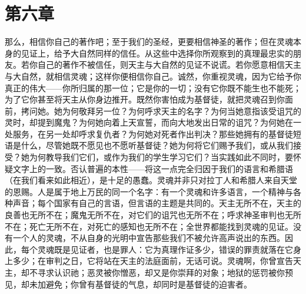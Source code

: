 
\section{第六章}

那么，相信你自己的著作吧；至于我们的圣经，更要相信神圣的著作；但在灵魂本身的见证上，给予大自然同样的信任。从这些中选择你所观察到的真理最忠实的朋友。若你自己的著作不被信任，则天主与大自然的见证不说谎。若你愿意相信天主与大自然，就相信灵魂；这样你便相信你自己。诚然，你重视灵魂，因为它给予你真正的伟大——你所归属的那一位；它是你的一切；没有它你既不能生也不能死；为了它你甚至将天主从你身边推开。既然你害怕成为基督徒，就把灵魂召到你面前，拷问她。她为何敬拜另一位？为何呼求天主的名字？为何当她意指该受诅咒的灵时，却提到魔鬼？为何她向着上天宣誓，而向大地发出日常的诅咒？为何她在一处服务，在另一处却呼求复仇者？为何她对死者作出判决？那些她拥有的基督徒短语是什么，尽管她既不愿见也不愿听基督徒？她为何将它们赐予我们，或从我们接受？她为何教导我们它们，或作为我们的学生学习它们？当实践如此不同时，要怀疑文字上的一致。否认普遍的本性——将这一点完全归因于我们的语言和希腊语（在我们看来如此相近），是十足的愚蠢。灵魂并非只对拉丁人和希腊人来自天堂的恩赐。人是属于地上万民的同一个名字：有一个灵魂和许多语言，一个精神与各种声音；每个国家有自己的言语，但言语的主题是共同的。天主无所不在，天主的良善也无所不在；魔鬼无所不在，对它们的诅咒也无所不在；呼求神圣审判也无所不在；死亡无所不在，对死亡的感知也无所不在；全世界都能找到灵魂的见证。没有一个人的灵魂，不从自身的光明中宣告那些我们不被允许高声说出的东西。因此，每个灵魂既是见证者，也是罪人：它为真理作证多少，错误的罪责就落在它身上多少；在审判之日，它将站在天主的法庭面前，无话可说。灵魂啊，你曾宣告天主，却不寻求认识祂；恶灵被你憎恶，却又是你崇拜的对象；地狱的惩罚被你预见，却未加避免；你曾有基督徒的气息，却同时是基督徒的迫害者。\par

